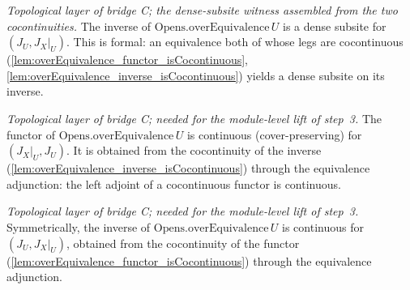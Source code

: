 \begin{lemma}
  \label{lem:overEquivalence_inverse_isDenseSubsite}
  \textit{Topological layer of bridge C; the dense-subsite witness assembled from the two
  cocontinuities.}
  The inverse of \(\mathrm{Opens.overEquivalence}\,U\) is a dense subsite for \((J_U, J_X|_U)\).
  This is formal: an equivalence both of whose legs are cocontinuous
  (\cref{lem:overEquivalence_functor_isCocontinuous},
  \cref{lem:overEquivalence_inverse_isCocontinuous}) yields a dense subsite on its inverse.
\end{lemma}

\begin{lemma}
  \label{lem:overEquivalence_functor_isContinuous}
  \textit{Topological layer of bridge C; needed for the module-level lift of step~3.}
  The functor of \(\mathrm{Opens.overEquivalence}\,U\) is continuous (cover-preserving) for
  \((J_X|_U, J_U)\). It is obtained from the cocontinuity of the inverse
  (\cref{lem:overEquivalence_inverse_isCocontinuous}) through the equivalence adjunction: the
  left adjoint of a cocontinuous functor is continuous.
\end{lemma}

\begin{lemma}
  \label{lem:overEquivalence_inverse_isContinuous}
  \textit{Topological layer of bridge C; needed for the module-level lift of step~3.}
  Symmetrically, the inverse of \(\mathrm{Opens.overEquivalence}\,U\) is continuous for
  \((J_U, J_X|_U)\), obtained from the cocontinuity of the functor
  (\cref{lem:overEquivalence_functor_isCocontinuous}) through the equivalence adjunction.
\end{lemma}

